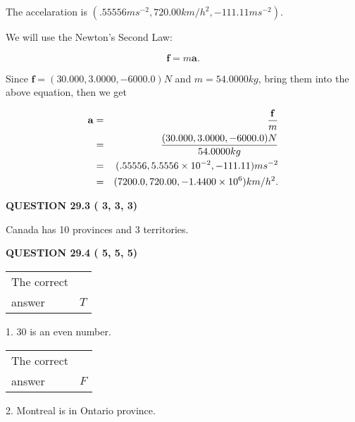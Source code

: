\documentclass[12pt]{article}
\begin{document}
 
The accelaration is
$(
.55556ms^{-2},
720.00km/h^2,
-111.11ms^{-2}
).
$
 
 
 
 
 
 
\noindent{}

We will use the Newton's Second Law:
 
\[
\mathbf{f}=m\mathbf{a}.
\]
 
Since $\mathbf{f}=( %
30.000,  %
3.0000,  %
-6000.0 )N$
and $m= %
54.0000kg$, bring them into the above equation, then we get
 
\begin{eqnarray*}
\mathbf{a}&=&\frac{\mathbf{f}}m  \\
&=&\frac{(
30.000 ,
3.0000 ,
-6000.0 )N
}{ %
54.0000 kg}  \\
&=&(
.55556 ,
5.5556 \times 10^{-2},
-111.11
)ms^{-2} \\
&=&(
7200.0 ,
720.00 ,
-1.4400 \times 10^{6}
)km/h^2.
\end{eqnarray*}
 
 
 
  
\vspace{0.2in}
  
{\textbf{\Large{QUESTION
29.3 
 (          3,          3,          3)
}}}
  
  
 
 
\noindent{}
 
 
Canada has  %
10 provinces and  %
3 territories.
 
 
 
 
  
\vspace{0.2in}
  
{\textbf{\Large{QUESTION
29.4 
 (          5,          5,          5)
}}}
  
  
 
 
\noindent{}

 
\noindent\begin{tabular}{|l|l|}\hline The correct & \\
          answer &  %
$T$ \\ \hline \end{tabular}
1. $ %
30$ is an  %
even number.
 
\noindent\begin{tabular}{|l|l|}\hline The correct & \\
          answer &  %
$F$ \\ \hline \end{tabular}
2.  %
Montreal is in  %
Ontario province.
 
\end{document}
